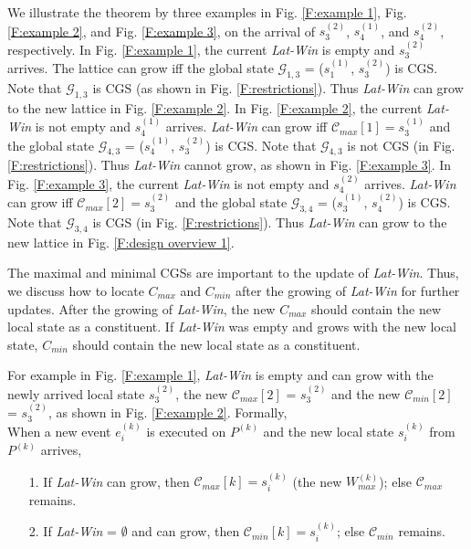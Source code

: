 \documentclass[12pt,journal,letterpaper,compsoc]{IEEEtran}
\begin{document}
We illustrate the theorem by three examples in Fig. \ref{F:example 1}, Fig. \ref{F:example 2}, and Fig. \ref{F:example 3}, on the arrival of $s^{(2)}_3$, $s^{(1)}_4$, and $s^{(2)}_4$, respectively. In Fig. \ref{F:example 1}, the current {\it Lat-Win} is empty and $s^{(2)}_{3}$ arrives. The lattice can grow iff the global state $\mathcal{G}_{1,3}$ = ($s^{(1)}_{1}$, $s^{(2)}_{3}$) is CGS. Note that $\mathcal{G}_{1,3}$ is CGS (as shown in Fig. \ref{F:restrictions}). Thus {\it Lat-Win} can grow to the new lattice in Fig. \ref{F:example 2}. In Fig. \ref{F:example 2}, the current {\it Lat-Win} is not empty and $s^{(1)}_{4}$ arrives. {\it Lat-Win} can grow iff $\mathcal{C}_{max}[1] = s^{(1)}_{3}$ and the global state $\mathcal{G}_{4,3}$ = ($s^{(1)}_{4}$, $s^{(2)}_{3}$) is CGS. Note that $\mathcal{G}_{4,3}$ is not CGS (in Fig. \ref{F:restrictions}). Thus {\it Lat-Win} cannot grow, as shown in Fig. \ref{F:example 3}. In Fig. \ref{F:example 3}, the current {\it Lat-Win} is not empty and $s^{(2)}_{4}$ arrives. {\it Lat-Win} can grow iff $\mathcal{C}_{max}[2] = s^{(2)}_{3}$ and the global state $\mathcal{G}_{3,4}$ = ($s^{(1)}_{3}$, $s^{(2)}_{4}$) is CGS. Note that $\mathcal{G}_{3,4}$ is CGS (in Fig. \ref{F:restrictions}). Thus {\it Lat-Win} can grow to the new lattice in Fig. \ref{F:design overview 1}.

The maximal and minimal CGSs are important to the update of {\it Lat-Win}. Thus, we discuss how to locate $C_{max}$ and $C_{min}$ after the growing of {\it Lat-Win} for further updates. After the growing of {\it Lat-Win}, the new $C_{max}$ should contain the new local state as a constituent. If {\it Lat-Win} was empty and grows with the new local state, $C_{min}$ should contain the new local state as a constituent.

For example in Fig. \ref{F:example 1}, {\it Lat-Win} is empty and can grow with the newly arrived local state $s^{(2)}_{3}$, the new $\mathcal{C}_{max}[2]$ = $s^{(2)}_{3}$ and the new $\mathcal{C}_{min}[2]$ = $s^{(2)}_{3}$, as shown in Fig. \ref{F:example 2}. Formally, \\

 When a new event $e^{(k)}_{i}$ is executed on $P^{(k)}$ and the new local state $s^{(k)}_{i}$ from $P^{(k)}$ arrives,
\begin{itemize}
    \item[1.] If {\it Lat-Win} can grow, then $\mathcal{C}_{max}[k] = s^{(k)}_{i}$ (the new $W^{(k)}_{max}$); else $\mathcal{C}_{max}$ remains.
    \item[2.] If {\it Lat-Win} = $\emptyset$ and can grow, then $\mathcal{C}_{min}[k] = s^{(k)}_{i}$; else $\mathcal{C}_{min}$ remains.
\end{itemize}
\end{document}
